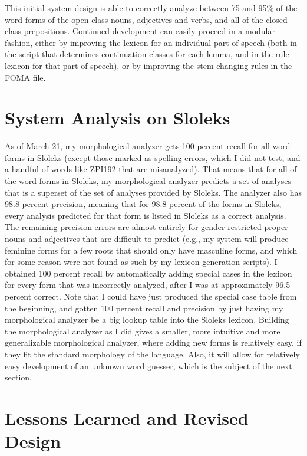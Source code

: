 \documentclass[11pt,letterpaper]{article}
\begin{document}
This initial system design is able to correctly analyze between 75 and 95\% of
the word forms of the open class nouns, adjectives and verbs, and all of the
closed class prepositions.  Continued development can easily proceed in a
modular fashion, either by improving the lexicon for an individual part of
speech (both in the script that determines continuation classes for each lemma,
and in the rule lexicon for that part of speech), or by improving the stem
changing rules in the FOMA file.

\section{System Analysis on Sloleks}

As of March 21, my morphological analyzer gets 100 percent recall for all word
forms in Sloleks (except those marked as spelling errors, which I did not test,
and a handful of words like ZPI192 that are misanalyzed).  That means that for
all of the word forms in Sloleks, my morphological analyzer predicts a set of
analyses that is a superset of the set of analyses provided by Sloleks.  The
analyzer also has 98.8 percent precision, meaning that for 98.8 percent of the
forms in Sloleks, every analysis predicted for that form is listed in Sloleks
as a correct analysis.  The remaining precision errors are almost entirely for
gender-restricted proper nouns and adjectives that are difficult to predict
(e.g., my system will produce feminine forms for a few roots that should only
have masculine forms, and which for some reason were not found as such by my
lexicon generation scripts).  I obtained 100 percent recall by automatically
adding special cases in the lexicon for every form that was incorrectly
analyzed, after I was at approximately 96.5 percent correct.  Note that I could
have just produced the special case table from the beginning, and gotten 100
percent recall and precision by just having my morphological analyzer be a big
lookup table into the Sloleks lexicon.  Building the morphological analyzer as
I did gives a smaller, more intuitive and more generalizable morphological
analyzer, where adding new forms is relatively easy, if they fit the standard
morphology of the language.  Also, it will allow for relatively easy
development of an unknown word guesser, which is the subject of the next
section.

\section{Lessons Learned and Revised Design}
\end{document}
